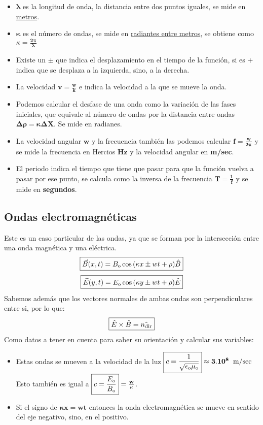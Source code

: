 \begin{itemize}
        \item \(\mathbf{\lambda}\) es la longitud de onda, la distancia entre dos puntos iguales, se mide en \underline{metros}.
        \item \(\mathbf{\kappa}\) es el número de ondas, se mide en \underline{radiantes entre metros}, se obtiene como \(\boxed{\kappa=\mathbf{\frac{2\pi}{\lambda}}}\)
        \item Existe un \(\mathbf{\pm}\) que indica el desplazamiento en el tiempo de la función, si es \(\mathbf{+}\) indica que se desplaza a la izquierda, sino, a la derecha.
        \item La velocidad \(\boxed{\mathbf{v = \frac{w}{k}}}\) e indica la velocidad a la que se mueve la onda.
        \item Podemos calcular el desfase de una onda como la variación de las fases iniciales, que equivale al número de ondas por la distancia entre ondas \(\boxed{\mathbf{\Delta \rho = \kappa \Delta X}}\). Se mide en radianes.
        \item La velocidad angular \(\mathbf{w}\) y la frecuencia también las podemos calcular \(\boxed{\mathbf{f = \frac{w}{2\pi}}}\) y se mide la frecuencia en Hercios \textbf{Hz} y la velocidad angular en \textbf{m/sec}.
        \item El periodo indica el tiempo que tiene que pasar para que la función vuelva a pasar por ese punto, se calcula como la inversa de la frecuencia \(\boxed{\mathbf{T = \frac{1}{f}}}\) y se mide en \textbf{segundos}.
\end{itemize}
\subsection{Ondas electromagnéticas}
\noindent Este es un caso particular de las ondas, ya que se forman por la intersección entre una onda magnética y una eléctrica.
\[
        \boxed{\vec{B}(x,t) = B_{\textnormal{o}} \cos{(\kappa x \pm  wt+\rho)} \hat{B}}
\]\[
        \boxed{\vec{E}(y,t) = E_{\textnormal{o}} \cos{(\kappa y \pm  wt+\rho)} \hat{E}}
\]
\noindent Sabemos además que los vectores normales de ambas ondas son perpendiculares entre si, por lo que:
\[
        \mathbf{\boxed{\hat{E} \times \hat{B} = \hat{n_{\textnormal{dir}}}}}
\]
\noindent Como datos a tener en cuenta para saber su orientación y calcular sus variables:
\begin{itemize}
        \item Estas ondas se mueven a la velocidad de la luz \(\mathbf{\boxed{c = \frac{1}{\sqrt{\epsilon_{\textnormal{o}}\mu_{\textnormal{o}}}}}\approx 3.10^8\hspace{2mm}\textnormal{m/sec}}\) Esto también es igual a \(\mathbf{\boxed{c=\frac{E_{\textnormal{o}}}{B_{\textnormal{o}}}} = \frac{w}{\kappa}}\).
        \item Si el signo de \(\boxed{\mathbf{ \kappa x } = \mathbf{wt}}\) entonces la onda electromagnética se mueve en sentido del eje negativo, sino, en el positivo.
\end{itemize}